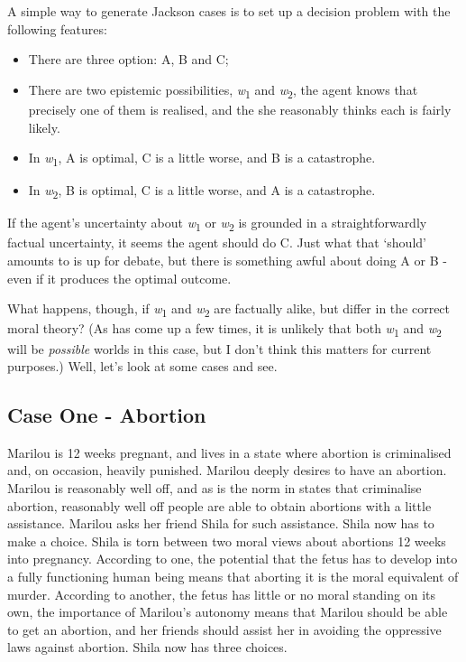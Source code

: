 \documentclass[
  10pt,
  letterpaper,
  twoside]{scrbook}
\providecommand{\tightlist}{%
  \setlength{\itemsep}{0pt}\setlength{\parskip}{0pt}}\usepackage{longtable,booktabs,array}
\begin{document}
A simple way to generate Jackson cases is to set up a decision problem
with the following features:

\begin{itemize}
\tightlist
\item
  There are three option: A, B and C;
\item
  There are two epistemic possibilities, \emph{w}\textsubscript{1} and
  \emph{w}\textsubscript{2}, the agent knows that precisely one of them
  is realised, and the she reasonably thinks each is fairly likely.
\item
  In \emph{w}\textsubscript{1}, A is optimal, C is a little worse, and B
  is a catastrophe.
\item
  In \emph{w}\textsubscript{2}, B is optimal, C is a little worse, and A
  is a catastrophe.
\end{itemize}

If the agent's uncertainty about \emph{w}\textsubscript{1} or
\emph{w}\textsubscript{2} is grounded in a straightforwardly factual
uncertainty, it seems the agent should do C. Just what that `should'
amounts to is up for debate, but there is something awful about doing A
or B - even if it produces the optimal outcome.

What happens, though, if \emph{w}\textsubscript{1} and
\emph{w}\textsubscript{2} are factually alike, but differ in the correct
moral theory? (As has come up a few times, it is unlikely that both
\emph{w}\textsubscript{1} and \emph{w}\textsubscript{2} will be
\emph{possible} worlds in this case, but I don't think this matters for
current purposes.) Well, let's look at some cases and see.

\subsection{Case One - Abortion}\label{caseone-abortion}

{Marilou} is 12 weeks pregnant, and lives in a state where abortion is
criminalised and, on occasion, heavily punished. {Marilou} deeply
desires to have an abortion. {Marilou} is reasonably well off, and as is
the norm in states that criminalise abortion, reasonably well off people
are able to obtain abortions with a little assistance. {Marilou} asks
her friend {Shila} for such assistance. {Shila} now has to make a
choice. {Shila} is torn between two moral views about abortions 12 weeks
into pregnancy. According to one, the potential that the fetus has to
develop into a fully functioning human being means that aborting it is
the moral equivalent of murder. According to another, the fetus has
little or no moral standing on its own, the importance of {Marilou}'s
autonomy means that {Marilou} should be able to get an abortion, and her
friends should assist her in avoiding the oppressive laws against
abortion. {Shila} now has three choices.
\end{document}
